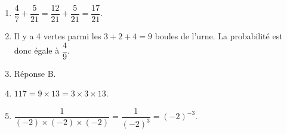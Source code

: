 \begin{enumerate}
\item $\dfrac{4}{7} + \dfrac{5}{21} = \dfrac{12}{21} + \dfrac{5}{21} = \dfrac{17}{21}$.
\item Il y a 4 vertes parmi les $3 + 2 + 4 = 9$ boules de l'urne. La probabilité est donc égale à $\dfrac{4}{9}$.
\item Réponse B.
\item $117 = 9 \times 13 = 3 \times 3 \times 13$.
\item $\dfrac{1}{(-2) \times (-2) \times (-2)} = \dfrac{1}{(- 2)^3} = (- 2)^{-3}$.
\end{enumerate}

\medskip

